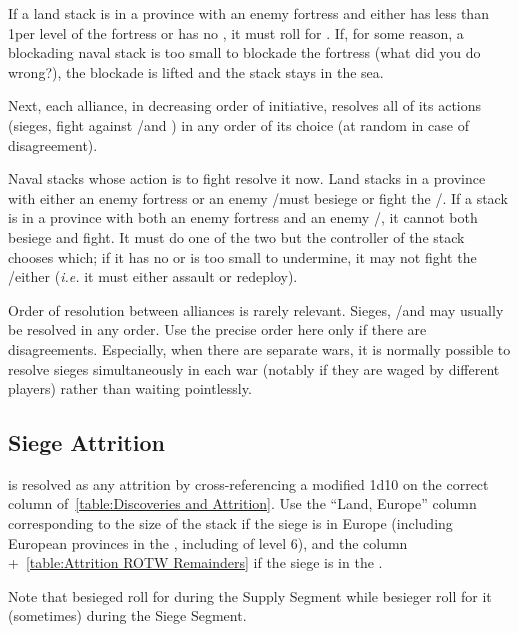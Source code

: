 If a land stack is in a province with an enemy fortress and either has less
than 1\LD per level of the fortress or has no \LoS , it must roll for
. If, for some reason, a blockading naval stack is too
small to blockade the fortress (what did you do wrong?), the blockade is
lifted and the stack stays in the sea.

Next, each alliance, in decreasing order of initiative, resolves all of its
actions (sieges, fight against \REVOLT/\REBELLION and \corsaire) in any order
of its choice (at random in case of disagreement).

Naval stacks whose action is to fight \corsaire resolve it now. Land stacks in
a province with either an enemy fortress or an enemy \REVOLT/\REBELLION must
besiege or fight the \REVOLT/\REBELLION. If a stack is in a province with both
an enemy fortress and an enemy \REVOLT/\REBELLION, it cannot both besiege and
fight. It must do one of the two but the controller of the stack chooses
which; if it has no \LoS or is too small to undermine, it may not fight the
\REVOLT/\REBELLION either (\emph{i.e.} it must either assault or redeploy).

\begin{playtip}
  Order of resolution between alliances is rarely relevant. Sieges,
  \REVOLT/\REBELLION and \corsaire may usually be resolved in any order. Use
  the precise order here only if there are disagreements. Especially, when
  there are separate wars, it is normally possible to resolve sieges
  simultaneously in each war (notably if they are waged by different players)
  rather than waiting pointlessly.
\end{playtip}

\subsection{Siege Attrition}
 is resolved as any attrition by cross-referencing a
modified 1d10 on the correct column of~\ref{table:Discoveries and
  Attrition}. Use the ``Land, Europe'' column corresponding to the size of the
stack if the siege is in Europe (including European provinces in the \ROTW,
including \COL of level 6), and the \ROTW column +~\ref{table:Attrition ROTW
  Remainders} if the siege is in the \ROTW.

Note that besieged roll for  during the Supply Segment
while besieger roll for it (sometimes) during the Siege Segment.

